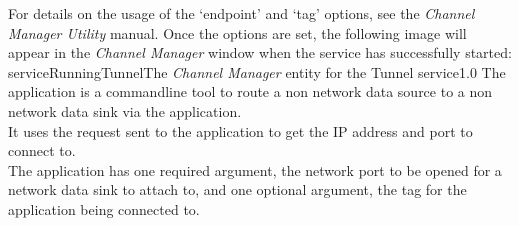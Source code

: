 For details on the usage of the `endpoint' and `tag' options, see the \emph{Channel
Manager Utility} manual.
Once the options are set, the following image will appear in the \emph{Channel Manager}
window when the service has successfully started:
%
{serviceRunningTunnel}{The \emph{Channel Manager} entity for the Tunnel service}{1.0}
\condPage
{}
The  application is a command\longDash{}line tool to route a
non\longDash\yarp{} network data source to a non\longDash\yarp{} network data sink via
the  application.\\

It uses the  request sent to the
 application to get the IP address and port to connect
to.\\

The application has one required argument, the network port to be opened for a network
data sink to attach to, and one optional argument, the tag for the
 application being connected to.
\insertShortClientParameters
{}
\secondaryEnd
\primaryEnd{}
